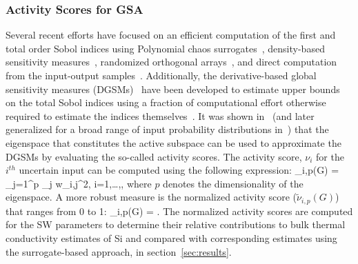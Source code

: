 \subsubsection{Activity Scores for GSA}
\label{subsub:gsa_as}
Several recent efforts have
focused on an efficient computation of the first and total order Sobol indices
using Polynomial chaos surrogates~\cite{Sudret:2008}, density-based sensitivity measures~\cite{Plischke:2013},
 randomized orthogonal arrays~\cite{Tissot:2015}, and direct computation from the input-output 
 samples~\cite{Li:2016}. Additionally,
the derivative-based global sensitivity measures (DGSMs)~\cite{Sobol:2009, Lamboni:2013}
have been developed to estimate upper bounds on the total Sobol indices using a fraction of computational effort
otherwise required to estimate the indices themselves~\cite{Vohra:2018b}. It was shown 
in~\cite{Diaz:2016,Constantine:2017} (and later generalized for a broad range of input probability distributions 
in~\cite{Vohra:2018c}) that the eigenspace that constitutes the active subspace can be used to
approximate the DGSMs by evaluating the so-called activity scores. The activity score, $\nu_i$ for the 
$i^{th}$ uncertain input can be computed using the following expression:
%
\be
\nu_{i,p}(G) = \sum\limits_{j=1}^{p} \lambda_j w_{i,j}^2, i=1,\ldots,\Nt,
\label{eq:ac}
\ee
%
where $p$ denotes the dimensionality of the eigenspace. 
A more robust measure is the normalized activity score ($\tilde{\nu}_{i,p}(G)$) that ranges from 0 to 1:
%
\be
\tilde{\nu}_{i,p}(G) = .
\label{eq:nac}
\ee
%
The normalized activity scores are computed for the SW parameters to determine their relative contributions
to bulk thermal conductivity estimates of Si and compared with corresponding estimates using the surrogate-based
approach, in section~\ref{sec:results}. 


